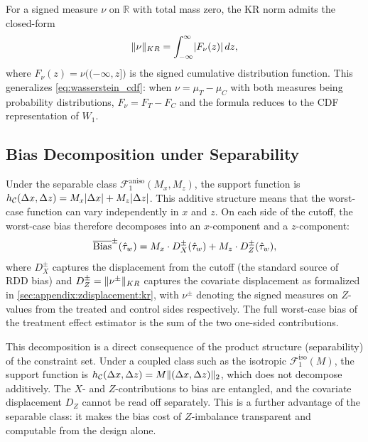 \begin{remark}[Computation]\label{rem:kr_computation}
	For a signed measure $\nu$ on $\mathbb{R}$ with total mass zero, the KR norm admits the closed-form
	\begin{equation}\label{eq:kr_cdf}
		\lVert\nu\rVert_{KR} = \int_{-\infty}^{\infty} \lvert F_\nu(z)\rvert\, dz,
	\end{equation}
	where $F_\nu(z) = \nu\bigl((-\infty, z]\bigr)$ is the signed cumulative distribution function.
	This generalizes \eqref{eq:wasserstein_cdf}: when $\nu = \mu_T - \mu_C$ with both measures being probability distributions, $F_\nu = F_T - F_C$ and the formula reduces to the CDF representation of $W_1$.
\end{remark}


\subsection{Bias Decomposition under Separability}\label{sec:appendix:zdisplacement:decomposition}

Under the separable class $\mathcal{F}_1^{\mathrm{aniso}}(M_x, M_z)$, the support function is $h_{\mathcal{C}}(\Delta x, \Delta z) = M_x \lvert\Delta x\rvert + M_z \lvert\Delta z\rvert$.
This additive structure means that the worst-case function can vary independently in $x$ and $z$.
On each side of the cutoff, the worst-case bias therefore decomposes into an $x$-component and a $z$-component:
\begin{equation}\label{eq:bias_decomposition}
	\overline{\mathrm{Bias}}^{\pm}(\hat{\tau}_w) = M_x \cdot D_X^{\pm}(\hat{\tau}_w) + M_z \cdot D_Z^{\pm}(\hat{\tau}_w),
\end{equation}
where $D_X^{\pm}$ captures the displacement from the cutoff (the standard source of RDD bias) and $D_Z^{\pm} = \lVert\nu^{\pm}\rVert_{KR}$ captures the covariate displacement as formalized in \cref{sec:appendix:zdisplacement:kr}, with $\nu^{\pm}$ denoting the signed measures on $Z$-values from the treated and control sides respectively.
The full worst-case bias of the treatment effect estimator is the sum of the two one-sided contributions.

This decomposition is a direct consequence of the product structure (separability) of the constraint set.
Under a coupled class such as the isotropic $\mathcal{F}_1^{\mathrm{iso}}(M)$, the support function is $h_{\mathcal{C}}(\Delta x, \Delta z) = M \lVert(\Delta x, \Delta z)\rVert_2$, which does not decompose additively.
The $X$- and $Z$-contributions to bias are entangled, and the covariate displacement $D_Z$ cannot be read off separately.
This is a further advantage of the separable class: it makes the bias cost of $Z$-imbalance transparent and computable from the design alone.

